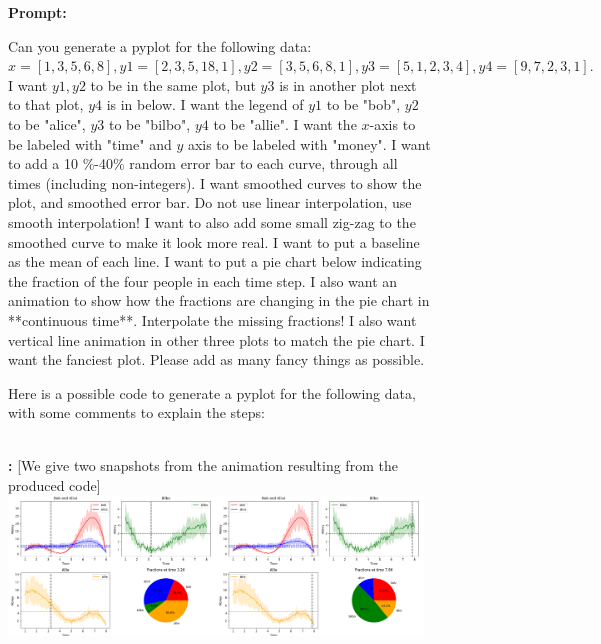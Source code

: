 \begin{figure}
\begin{AIbox}{\DV}
{
}
\tcbline
{\small \bf Prompt:} {\scriptsize Can you generate a pyplot for the following data: $x = [1, 3, 5, 6, 8], y1 = [2, 3, 5, 18, 1], y2 = [3, 5, 6, 8, 1], y3 = [5, 1, 2, 3, 4], y4 = [9, 7, 2, 3,  1].$ I want $y1, y2$ to be in the same plot, but $y3$ is in another plot next to that plot, $y4$ is in below. I want the legend of $y1$ to be "bob", $y2$ to be "alice", $y3$ to be "bilbo", $y4$ to be "allie".
I want the $x$-axis to be labeled with "time" and $y$ axis to be labeled with "money".
I want to add a 10 \%-40\% random error bar to each curve, through all times (including non-integers).
I want smoothed curves to show the plot, and smoothed error bar. Do not use linear interpolation, use smooth interpolation!
I want to also add some small zig-zag to the smoothed curve to make it look more real.
I want to put a baseline as the mean of each line.
I want to put a pie chart below indicating the fraction of the four people in each time step.
I also want an animation to show how the fractions are changing in the pie chart in **continuous time**. Interpolate the missing fractions!
I also want vertical line animation in other three plots to match the pie chart.
I want the fanciest plot. Please add as many fancy things as possible.

Here is a possible code to generate a pyplot for the following data, with some comments to explain the steps:} \\

{\small \bf \DV:} {\scriptsize [We give two snapshots from the animation resulting from the produced code]} \\

\includegraphics[width=0.49\textwidth]{figures/ff_1.png}\includegraphics[width=0.49\textwidth]{figures/ff_2.png}


\end{AIbox}
\end{figure}
